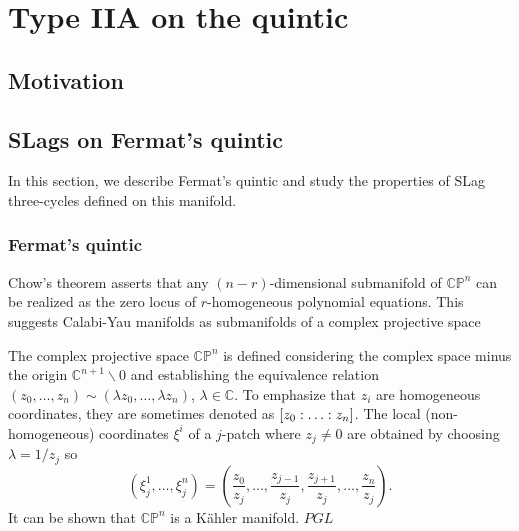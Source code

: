 \chapter{Type IIA on the quintic}

\section{Motivation}



\section{SLags on Fermat's quintic}
In this section, we describe Fermat's quintic and study the properties of SLag three-cycles 
defined on this manifold.

\subsection{Fermat's quintic}
Chow's theorem asserts  that any $(n-r)$-dimensional submanifold of $\mathbb{CP}^n$ can be realized as the zero locus of $r$-homogeneous polynomial equations.
This suggests Calabi-Yau manifolds as submanifolds of a complex projective space

The complex projective space $\mathbb{CP}^n$ is defined considering the complex space minus the origin $\mathbb{C}^{n+1}\backslash\qty{0}$
and establishing the equivalence relation $( z_0,\ldots, z_{n})\sim(\lambda z_0,\ldots,\lambda z_{n})$, $\lambda\in\mathbb C$.
To emphasize that $z_i$ are homogeneous coordinates, they are sometimes denoted as $\qty[z_0:\ldots:z_{n}]$.
The local (non-homogeneous) coordinates $\xi^i$ of a $j$-patch where $z_j\neq0$ are obtained by choosing $\lambda=1/z_j$ so
\begin{equation}
  (\xi^1_j,\ldots,\xi^n_j)=(\frac{z_0}{z_j},\ldots,\frac{z_{j-1}}{z_j},\frac{z_{j+1}}{z_j},\ldots,\frac{z_{n}}{z_j}).
\end{equation}
It can be shown that $\mathbb{CP}^n$ is a Kähler manifold.
$PGL$


